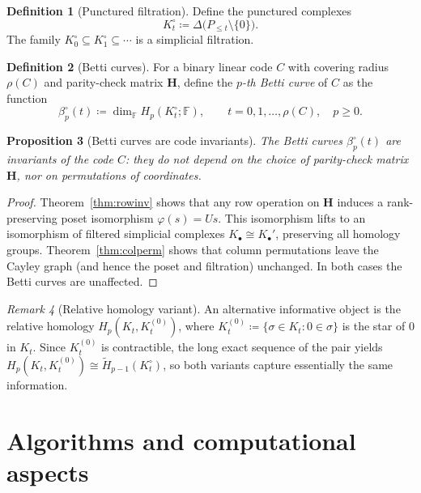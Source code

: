\documentclass[11pt,twoside,leqno]{article}
\theoremstyle{definition}
\newtheorem{definition}{Definition}[section]
\theoremstyle{plain}
\newtheorem{proposition}[definition]{Proposition}
\theoremstyle{remark}
\newtheorem{remark}[definition]{Remark}
\newcommand{\HH}{\mathbf{H}}
\newcommand{\covrad}{\rho}
\begin{document}
\begin{definition}[Punctured filtration]\label{def:punctured}
Define the punctured complexes
\[
K_t^\circ \coloneqq \Delta\bigl(P_{\le t}\setminus\{0\}\bigr).
\]
The family $K_0^\circ\subseteq K_1^\circ\subseteq\cdots$ is a simplicial filtration.
\end{definition}

\begin{definition}[Betti curves]\label{def:betticurves}
For a binary linear code $C$ with covering radius $\covrad(C)$ and parity-check matrix $\HH$, define the
\emph{$p$-th Betti curve} of $C$ as the function
\[
\beta_p^\circ(t)\coloneqq\dim_\mathbb{F} H_p(K_t^\circ;\mathbb{F}),\qquad
t=0,1,\ldots,\covrad(C),\quad p\ge 0.
\]
\end{definition}

\begin{proposition}[Betti curves are code invariants]\label{prop:bettiinv}
The Betti curves $\beta_p^\circ(t)$ are invariants of the code $C$: they do not depend on the choice
of parity-check matrix $\HH$, nor on permutations of coordinates.
\end{proposition}

\begin{proof}
Theorem~\ref{thm:rowinv} shows that any row operation on $\HH$ induces a rank-preserving poset
isomorphism $\varphi(s)=Us$. This isomorphism lifts to an isomorphism of filtered simplicial complexes
$K_\bullet \cong K_\bullet'$, preserving all homology groups. Theorem~\ref{thm:colperm} shows that
column permutations leave the Cayley graph (and hence the poset and filtration) unchanged. In both
cases the Betti curves are unaffected.
\end{proof}

\begin{remark}[Relative homology variant]
An alternative informative object is the relative homology $H_p(K_t, K_t^{(0)})$, where
$K_t^{(0)}\coloneqq\{\sigma\in K_t: 0\in\sigma\}$ is the star of $0$ in $K_t$. Since $K_t^{(0)}$
is contractible, the long exact sequence of the pair yields $H_p(K_t,K_t^{(0)})\cong\widetilde{H}_{p-1}(K_t^\circ)$,
so both variants capture essentially the same information.
\end{remark}

\section{Algorithms and computational aspects}\label{sec:algorithms}
\end{document}

